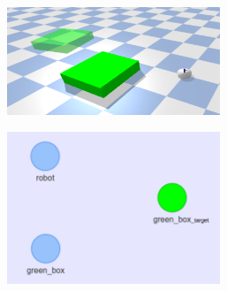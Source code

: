 \begin{figure}[H]
    \centering
    \begin{subfigure}{.49\textwidth}
    \centering
    \includegraphics[width=0.7\textwidth]{figures/example_hyp_graph/robot_box_and_ghost}
    \caption{}%
    \hfill
    \end{subfigure}
    \hfill
    \begin{subfigure}{.49\textwidth}
    \centering
    \includegraphics[width=0.7\textwidth]{figures/example_hyp_graph/1}
    \caption{}%
    \end{subfigure}


\end{figure}
